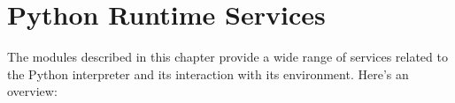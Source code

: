\chapter{Python Runtime Services
         \label{python}}

The modules described in this chapter provide a wide range of services
related to the Python interpreter and its interaction with its
environment.  Here's an overview:

\localmoduletable
